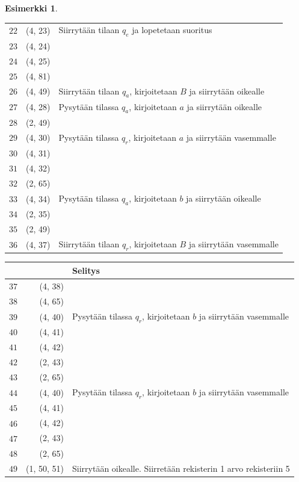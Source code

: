 \documentclass[a4paper, 12pt]{article}
\theoremstyle{definition}
\newtheorem{example}[mydef]{Esimerkki}
\theoremstyle{plain}
\begin{document}
\begin{example}
\begin{center}
\begin{tabular}[t]{r|r|l}
$\hat{22}$ & (4, 23) & Siirrytään tilaan $q_e$ ja lopetetaan suoritus \\
$\hat{23}$ & (4, 24) &  \\
$\hat{24}$ & (4, 25) &  \\
$\hat{25}$ & (4, 81) &  \\
$\hat{26}$ & (4, 49) & Siirrytään tilaan $q_a$, kirjoitetaan $B$ ja siirrytään oikealle \\
$\hat{27}$ & (4, 28) & Pysytään tilassa $q_a$, kirjoitetaan $a$ ja siirrytään oikealle \\
$\hat{28}$ & (2, 49) &  \\
$\hat{29}$ & (4, 30) & Pysytään tilassa $q_r$, kirjoitetaan $a$ ja siirrytään vasemmalle \\
$\hat{30}$ & (4, 31) &  \\
$\hat{31}$ & (4, 32) &  \\
$\hat{32}$ & (2, 65) &  \\
$\hat{33}$ & (4, 34) & Pysytään tilassa $q_a$, kirjoitetaan $b$ ja siirrytään oikealle \\
$\hat{34}$ & (2, 35) &  \\
$\hat{35}$ & (2, 49) &  \\
$\hat{36}$ & (4, 37) & Siirrytään tilaan $q_r$, kirjoitetaan $B$ ja siirrytään vasemmalle \\
\end{tabular}
\end{center}
\begin{center}
\begin{tabular}[t]{r|r|l}
& & Selitys\\
\hline
$\hat{37}$ & (4, 38) &  \\
$\hat{38}$ & (4, 65) &  \\
$\hat{39}$ & (4, 40) & Pysytään tilassa $q_r$, kirjoitetaan $b$ ja siirrytään vasemmalle \\
$\hat{40}$ & (4, 41) &  \\
$\hat{41}$ & (4, 42) &  \\
$\hat{42}$ & (2, 43) &  \\
$\hat{43}$ & (2, 65) &  \\
$\hat{44}$ & (4, 40) & Pysytään tilassa $q_r$, kirjoitetaan $b$ ja siirrytään vasemmalle \\
$\hat{45}$ & (4, 41) &  \\
$\hat{46}$ & (4, 42) &  \\
$\hat{47}$ & (2, 43) &  \\
$\hat{48}$ & (2, 65) &  \\
$\hat{49}$ & (1, 50, 51) & Siirrytään oikealle. Siirretään rekisterin 1 arvo rekisteriin 5 \\

\end{tabular}
\end{center}
\end{example}
\end{document}
